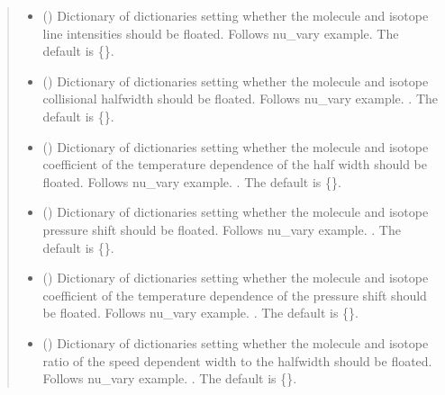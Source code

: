 \documentclass[letterpaper,10pt,english]{sphinxmanual}
\begin{document}
\begin{fulllineitems}
\begin{fulllineitems}
\begin{quote}
\begin{description}
\begin{itemize}
\item {} 
\sphinxAtStartPar
{} (\sphinxstyleliteralemphasis{\sphinxupquote{, }}) \textendash{} Dictionary of dictionaries setting whether the molecule and isotope line intensities should be floated.  Follows nu\_vary example.  The default is \{\}.

\item {} 
\sphinxAtStartPar
{} (\sphinxstyleliteralemphasis{\sphinxupquote{, }}) \textendash{} Dictionary of dictionaries setting whether the molecule and isotope collisional half\sphinxhyphen{}width should be floated.  Follows nu\_vary example.  . The default is \{\}.

\item {} 
\sphinxAtStartPar
{} (\sphinxstyleliteralemphasis{\sphinxupquote{, }}) \textendash{} Dictionary of dictionaries setting whether the molecule and isotope coefficient of the temperature dependence of the half width  should be floated.  Follows nu\_vary example.  . The default is \{\}.

\item {} 
\sphinxAtStartPar
{} (\sphinxstyleliteralemphasis{\sphinxupquote{, }}) \textendash{} Dictionary of dictionaries setting whether the molecule and isotope pressure shift should be floated.  Follows nu\_vary example.  . The default is \{\}.

\item {} 
\sphinxAtStartPar
{} (\sphinxstyleliteralemphasis{\sphinxupquote{, }}) \textendash{} Dictionary of dictionaries setting whether the molecule and isotope coefficient of the temperature dependence of the pressure shift should be floated.  Follows nu\_vary example.  . The default is \{\}.

\item {} 
\sphinxAtStartPar
{} (\sphinxstyleliteralemphasis{\sphinxupquote{, }}) \textendash{} Dictionary of dictionaries setting whether the molecule and isotope ratio of the speed dependent width to the half\sphinxhyphen{}width should be floated.  Follows nu\_vary example.  . The default is \{\}.


\end{itemize}
\end{description}
\end{quote}
\end{fulllineitems}
\end{fulllineitems}
\end{document}
